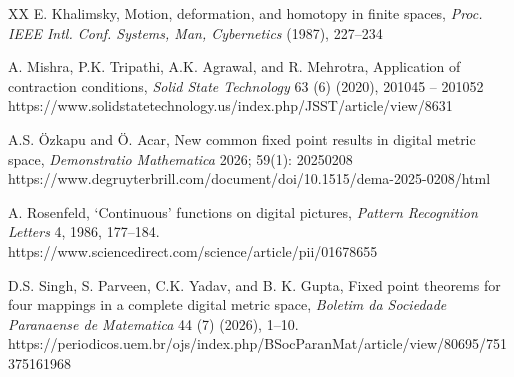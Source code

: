 \documentclass{article}
\numberwithin{thm}{section}
\begin{document}
\begin{thebibliography}{XX}
E. Khalimsky,
Motion, deformation, and homotopy in finite spaces,
{\em Proc. IEEE Intl. Conf. Systems, Man, Cybernetics}
(1987), 227--234


A. Mishra, P.K. Tripathi, A.K. Agrawal, and
R. Mehrotra,
Application of contraction conditions,
{\em Solid State Technology}
63 (6) (2020), 201045 -- 201052
\newline
https://www.solidstatetechnology.us/index.php/JSST/article/view/8631 

A.S. Özkapu and Ö. Acar,
New common fixed point results in digital
metric space,
{\em Demonstratio Mathematica}
2026; 59(1): 20250208
\newline
https://www.degruyterbrill.com/document/doi/10.1515/dema-2025-0208/html 

A. Rosenfeld, `Continuous' functions on digital pictures, 
{\em Pattern Recognition Letters} 4, 1986, 177--184.
\newline
https://www.sciencedirect.com/science/article/pii/01678655

D.S. Singh, S. Parveen, C.K. Yadav,
and B. K. Gupta,
Fixed point theorems for four mappings in a complete digital metric space,
{\em Boletim da Sociedade Paranaense de Matematica}
44 (7) (2026), 1–10.
\newline
https://periodicos.uem.br/ojs/index.php/BSocParanMat/article/view/80695/751375161968 

\end{thebibliography}
\end{document}
